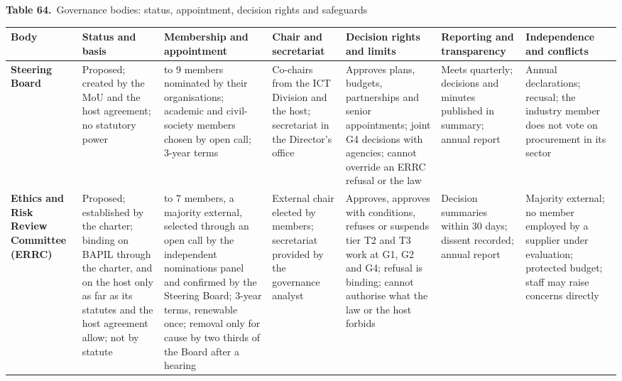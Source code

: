 \documentclass[border=10pt]{standalone}
\begin{document}
\begin{minipage}{22cm}
{\large\bfseries Table 64.}\ {\large Governance bodies: status, appointment, decision rights and safeguards}\par\vspace{7pt}
\small
{}
\begin{tabularx}{\linewidth}{@{}>{\hsize=1.031\hsize\raggedright\arraybackslash}X>{\hsize=0.977\hsize\raggedright\arraybackslash}X>{\hsize=1.194\hsize\raggedright\arraybackslash}X>{\hsize=0.705\hsize\raggedright\arraybackslash}X>{\hsize=1.194\hsize\raggedright\arraybackslash}X>{\hsize=0.868\hsize\raggedright\arraybackslash}X>{\hsize=1.031\hsize\raggedright\arraybackslash}X@{}}
\arrayrulecolor{bapilrule}\toprule
\rowcolor{white}\textbf{Body} & \textbf{Status and basis} & \textbf{Membership and appointment} & \textbf{Chair and secretariat} & \textbf{Decision rights and limits} & \textbf{Reporting and transparency} & \textbf{Independence and conflicts} \\
\midrule
\textbf{Steering Board} & Proposed; created by the MoU and the host agreement; no statutory power & 7 to 9 members nominated by their organisations; academic and civil-society members chosen by open call; 3-year terms & Co-chairs from the ICT Division and the host; secretariat in the Director’s office & Approves plans, budgets, partnerships and senior appointments; joint G4 decisions with agencies; cannot override an ERRC refusal or the law & Meets quarterly; decisions and minutes published in summary; annual report & Annual declarations; recusal; the industry member does not vote on procurement in its sector \\
\textbf{Ethics and Risk Review Committee (ERRC)} & Proposed; established by the charter; binding on BAPIL through the charter, and on the host only as far as its statutes and the host agreement allow; not by statute & 5 to 7 members, a majority external, selected through an open call by the independent nominations panel and confirmed by the Steering Board; 3-year terms, renewable once; removal only for cause by two thirds of the Board after a hearing & External chair elected by members; secretariat provided by the governance analyst & Approves, approves with conditions, refuses or suspends tier T2 and T3 work at G1, G2 and G4; refusal is binding; cannot authorise what the law or the host forbids & Decision summaries within 30 days; dissent recorded; annual report & Majority external; no member employed by a supplier under evaluation; protected budget; staff may raise concerns directly \\

\end{tabularx}
\end{minipage}
\end{document}

